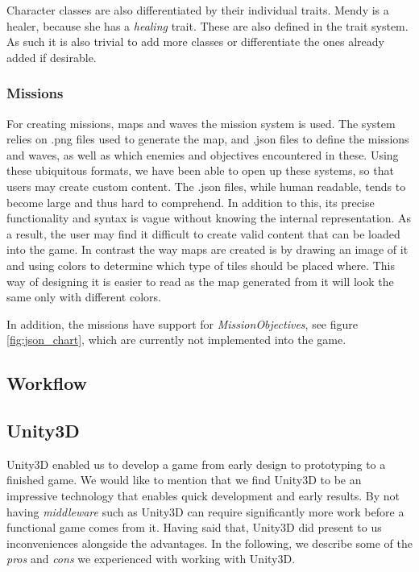 Character classes are also differentiated by their individual traits.
Mendy is a healer, because she has a \emph{healing} trait.
These are also defined in the trait system.
As such it is also trivial to add more classes or differentiate the ones already added if desirable.

\subsubsection{Missions}\label{dicsussion:missions}
For creating missions, maps and waves the mission system is used.
The system relies on .png files used to generate the map, and .json files to define the missions and waves, as well as which enemies and objectives encountered in these.
Using these ubiquitous formats, we have been able to open up these systems, so that users may create custom content.
The .json files, while human readable, tends to become large and thus hard to comprehend.
In addition to this, its precise functionality and syntax is vague without knowing the internal representation.
As a result, the user may find it difficult to create valid content that can be loaded into the game.
In contrast the way maps are created is by drawing an image of it and using colors to determine which type of tiles should be placed where. This way of designing it is easier to read as the map generated from it will look the same only with different colors.

In addition, the missions have support for \textit{MissionObjectives}, see figure \ref{fig:json_chart}, which are currently not implemented into the game.

\subsection{Workflow}

\subsection{Unity3D}
Unity3D enabled us to develop a game from early design to prototyping to a
finished game. We would like to mention that we find Unity3D to be an
impressive technology that enables quick development and early results. By not
having \textit{middleware} such as Unity3D can require significantly more work
before a functional game comes from it.
Having said that, Unity3D did present to us inconveniences alongside the
advantages. In the following, we describe some of the \textit{pros} and
\textit{cons} we experienced with working with Unity3D.

